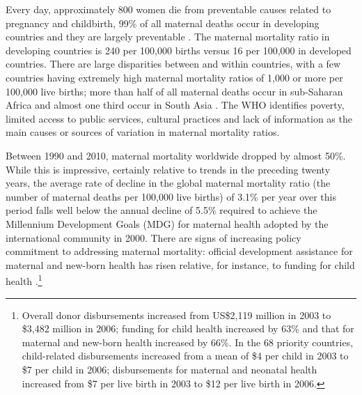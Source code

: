 \documentclass{article}[12pt,subeqn]
\begin{document}
\begin{spacing}{1.4}
Every day, approximately 800 women die from preventable causes related to 
pregnancy and childbirth, 99\% of all maternal deaths occur in developing 
countries and they are largely preventable \citep{WHO2012}. The maternal 
mortality ratio in developing countries is 240 per 100,000 births versus 16 per 
100,000 in developed countries. There are large disparities between and within 
countries, with a few countries having extremely high maternal mortality ratios 
of 1,000 or more per 100,000 live births; more than half of all maternal deaths 
occur in sub-Saharan Africa and almost one third occur in South Asia 
\citep{WHO2012}. The WHO identifies poverty, limited access to public services, 
cultural practices and lack of information as the main causes or sources of 
variation in maternal mortality ratios.

Between 1990 and 2010, maternal mortality worldwide dropped by almost 50\%. 
While this is impressive, certainly relative to trends in the preceding twenty 
years, the average rate of decline in the global maternal mortality ratio (the 
number of maternal deaths per 100,000 live births) of 3.1\% per year over this 
period falls well below the annual decline of 5.5\% required to achieve the 
Millennium Development Goals (MDG) for maternal health adopted by the 
international community in 2000. There are signs of increasing policy commitment 
to addressing maternal mortality: official development assistance for maternal 
and new-born health has risen relative, for instance, to funding for child 
health \citep{Grecoetal2008}.\footnote{Overall donor disbursements increased from 
US\$2,119 million in 2003 to \$3,482 million in 2006; funding for child
health increased by 63\% and that for maternal and new-born health increased by 
66\%. In the 68 priority countries, child-related disbursements increased from a 
mean of \$4 per child in 2003 to \$7 per child in 2006; disbursements for 
maternal and neonatal health increased from \$7 per live birth in 2003 to \$12 
per live birth in 2006.}


\end{spacing}
\end{document}
